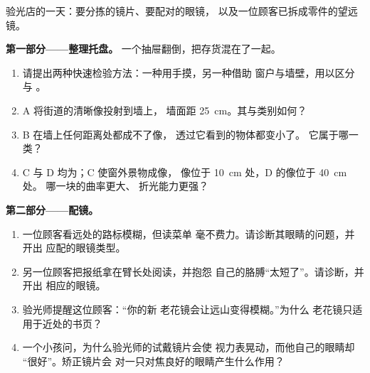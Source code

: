 \begin{problem}
\label{pb:g8:lenses-images:1}
验光店的一天：要分拣的镜片、要配对的眼镜，
以及一位顾客已拆成零件的望远镜。

\medskip\noindent\textbf{第一部分——整理托盘。}
一个抽屉翻倒，把存货混在了一起。
\begin{enumerate}
  \item 请提出两种快速检验方法：一种用手摸，另一种借助
        窗户与墙壁，用以区分与
        。
  \item {} A 将街道的清晰像投射到墙上，
        墙面距 \qty{25}{cm}。其与类别如何？
  \item {} B 在墙上任何距离处都成不了像，
        透过它看到的物体都变小了。
        它属于哪一类？
  \item {} C 与 D 均为；C 使窗外景物成像，
        像位于 \qty{10}{cm} 处，D 的像位于 \qty{40}{cm} 处。
        哪一块的曲率更大、
        折光能力更强？
\end{enumerate}

\medskip\noindent\textbf{第二部分——配镜。}
\begin{enumerate}[resume]
  \item 一位顾客看远处的路标模糊，但读菜单
        毫不费力。请诊断其眼睛的问题，并开出
        应配的眼镜类型。
  \item 另一位顾客把报纸拿在臂长处阅读，并抱怨
        自己的胳膊“太短了”。请诊断，并开出
        相应的眼镜。
  \item 验光师提醒这位顾客：“你的新
        老花镜会让远山变得模糊。”为什么
        老花镜只适用于近处的书页？
  \item 一个小孩问，为什么验光师的试戴镜片会使
        视力表晃动，而他自己的眼睛却
        “很好”。矫正镜片会
        对一只对焦良好的眼睛产生什么作用？
\end{enumerate}


\end{problem}
